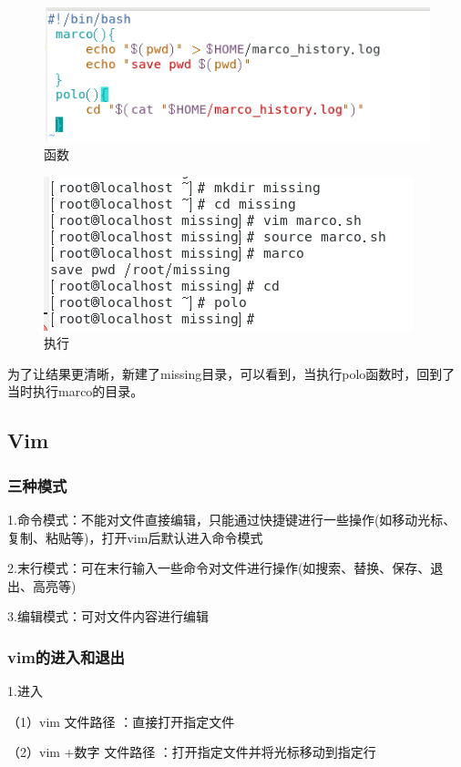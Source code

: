 \documentclass{ctexart}
\begin{document}
	\begin{figure}[H]
		\centering
		\includegraphics{2.32}
		\caption{函数}
	\end{figure}
	
	\begin{figure}[H]
		\centering
		\includegraphics{2.33}
		\caption{执行}
	\end{figure}
	
	为了让结果更清晰，新建了missing目录，可以看到，当执行polo函数时，回到了当时执行marco的目录。
	
	
	\subsection{Vim}
	\subsubsection{三种模式}
	1.命令模式：不能对文件直接编辑，只能通过快捷键进行一些操作(如移动光标、复制、粘贴等)，打开vim后默认进入命令模式
	
	2.末行模式：可在末行输入一些命令对文件进行操作(如搜索、替换、保存、退出、高亮等)
	
	3.编辑模式：可对文件内容进行编辑
	\subsubsection{vim的进入和退出}
	
	1.进入
	
	（1）vim 文件路径 ：直接打开指定文件
	
	（2）vim +数字 文件路径 ：打开指定文件并将光标移动到指定行
	
\end{document}
